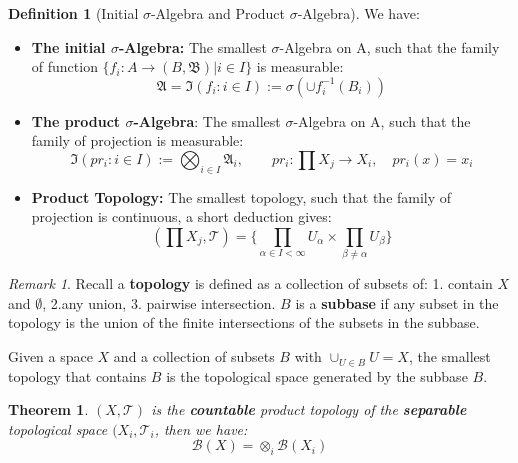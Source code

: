 \documentclass[a4paper,11pt,oneside,fleqn]{book}
\newtheorem{theorem}{Theorem}[section]
\theoremstyle{definition}
\newtheorem{definition}{Definition}[section]
\theoremstyle{remark}
\newtheorem*{remark}{Remark}
\begin{document}
\begin{definition}[Initial $\sigma$-Algebra and Product $\sigma$-Algebra]
	We have:
	\begin{itemize}
		\item\textbf{The initial $\sigma$-Algebra: } The smallest $\sigma$-Algebra on A, such that the family of function $\{f_i : A \rightarrow  (B, \mathfrak{B})| i \in I\}$ is measurable:
			\begin{equation*}
				\mathfrak{A} = \mathfrak{I}(f_i: i \in I) := \sigma(\cup f_i^{-1}(B_i) )
			\end{equation*} 
		\item \textbf{The product $\sigma$-Algebra}:
			The smallest $\sigma$-Algebra on A, such that the family of projection is measurable:
			\begin{equation*}
				\mathfrak{I}(pr_i: i \in I) := \bigotimes_{i \in I} \mathfrak{A}_i , \qquad pr_i: \prod X_j \rightarrow X_i, \quad  pr_i(x) = x_i
			\end{equation*}
		\item \textbf{Product Topology:} The smallest topology, such that the family of projection is continuous, a short deduction gives:
			\begin{equation*}
				(\prod X_j, \mathcal{T}) = \{ \prod_{\alpha \in I <\infty}  U_\alpha \times \prod_{\beta \neq \alpha} U_\beta \}
			\end{equation*}
	\end{itemize}
\end{definition}

\begin{remark}
Recall a \textbf{topology} is defined as a collection of subsets of: 1. contain $X$ and $\emptyset$, 2.any union, 3. pairwise intersection. 
 $B$ is a \textbf{subbase} if any subset in the topology is the union of the finite intersections of the subsets in the subbase. \par 
Given a space $X$ and a collection of subsets $B$ with $\cup_{U \in B} U = X$, the smallest topology that contains $B$ is the topological space generated by the subbase $B$.	
\end{remark}

\begin{theorem}
	$(X, \mathcal{T})$ is the \textbf{countable} product topology of the \textbf{separable} topological space $(X_i, \mathcal{T}_i$, then we have:
	\begin{equation*}
		\mathcal{B}(X) = \otimes_i \mathcal{B}(X_i)
	\end{equation*}
\end{theorem}
\end{document}
